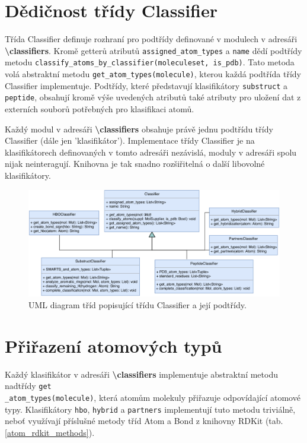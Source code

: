 
\section{Dědičnost třídy Classifier}
Třída Classifier definuje rozhraní pro podtřídy definované v modulech v adresáři \textbf{\textbackslash classifiers}. %
Kromě getterů atribu\-tů \verb|assigned_atom_types| a \verb|name| dědí podtřídy metodu \verb|classify_atoms_by_classifier(moleculeset, is_pdb)|. Ta\-to metoda volá abstra\-ktní metodu \verb|get_atom_types(molecule)|, kterou každá podtřída třídy Classifier implementuje. Podtřídy, které představují klasifikátory \verb|substruct| a \verb|peptide|, obsahují kromě výše uvedených atributů také atributy pro uložení dat z externích souborů potřebných pro klasifikaci atomů.

Každý modul v adresáři \textbf{\textbackslash classifiers} obsahuje právě jednu podtřídu třídy Classifier (dále jen 'klasifikátor'). Implementace třídy Classifier je na klasifikátorech definovaných v tomto adresáři nezávislá, moduly v adresáři spolu nijak neinteragují. Knihovna je tak snadno rozšiřitelná o další libovolné klasifikátory. 

\bigskip
\begin{figure}[h]
    \centering
    \includegraphics[width=15.1cm]{pictures/diagram_triangle.png}
    \caption{UML diagram tříd popisující třídu Classifier a její podtřídy.}
    \label{classes_UML}
\end{figure}

    
\section{Přiřazení atomových typů}
Každý klasifikátor v adresáři \textbf{\textbackslash classifiers} implementuje abstraktní metodu nadtřídy \verb|get|\\ \verb|_atom_types(molecule)|, která atomům molekuly přiřazuje odpovídající atomové ty\-py. Klasifikátory \verb|hbo|, \verb|hybrid| a \verb|partners| implementují tuto metodu triviálně, neboť využívají příslušné metody tříd Atom a Bond z knihovny RDKit (tab.  \ref{atom_rdkit_methods}). 

